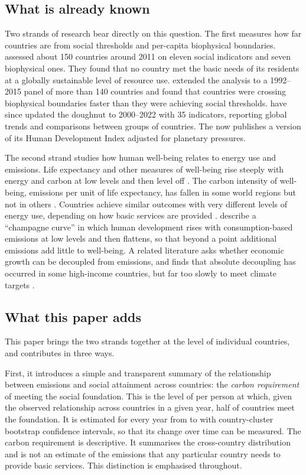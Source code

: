 \subsection*{What is already known}

Two strands of research bear directly on this question. The first measures how far countries are from social thresholds and per-capita biophysical boundaries. \citet{oneill2018} assessed about 150 countries around 2011 on eleven social indicators and seven biophysical ones. They found that no country met the basic needs of its residents at a globally sustainable level of resource use. \citet{fanning2022} extended the analysis to a 1992--2015 panel of more than 140 countries and found that countries were crossing biophysical boundaries faster than they were achieving social thresholds. \citet{fanning2025} have since updated the doughnut to 2000--2022 with 35 indicators, reporting global trends and comparisons between groups of countries. The \citet{undp2020} now publishes a version of its Human Development Index adjusted for planetary pressures.

The second strand studies how human well-being relates to energy use and emissions. Life expectancy and other measures of well-being rise steeply with energy and carbon at low levels and then level off \citep{steinberger2010,lamb2015}. The carbon intensity of well-being, emissions per unit of life expectancy, has fallen in some world regions but not in others \citep{jorgenson2014}. Countries achieve similar outcomes with very different levels of energy use, depending on how basic services are provided \citep{vogel2021}. \citet{porcher2026} describe a ``champagne curve'' in which human development rises with consumption-based emissions at low levels and then flattens, so that beyond a point additional emissions add little to well-being. A related literature asks whether economic growth can be decoupled from emissions, and finds that absolute decoupling has occurred in some high-income countries, but far too slowly to meet climate targets \citep{haberl2020,vogel2023}.

\subsection*{What this paper adds}

This paper brings the two strands together at the level of individual countries, and contributes in three ways.

First, it introduces a simple and transparent summary of the relationship between emissions and social attainment across countries: the \emph{carbon requirement} of meeting the social foundation. This is the level of \COtwo{} per person at which, given the observed relationship across countries in a given year, half of countries meet the foundation. It is estimated for every year from \nShareYearStart{} to \nLastYear{} with country-cluster bootstrap confidence intervals, so that its change over time can be measured. The carbon requirement is descriptive. It summarises the cross-country distribution and is not an estimate of the emissions that any particular country needs to provide basic services. This distinction is emphasised throughout.

